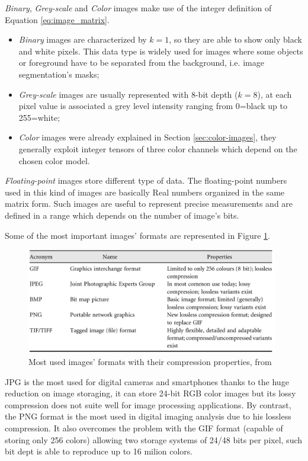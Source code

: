 \documentclass[../main.tex]{subfiles}
\begin{document}
\textit{Binary}, \textit{Grey-scale} and \textit{Color} images make use of the integer definition of Equation \ref{eq:image_matrix}.
\begin{itemize}
    \item \textit{Binary} images are  characterized by $k=1$, so they are able to show only black and white pixels. This data type is widely used for images where some objects or foreground have to be separated from the background, i.e. image segmentation's masks;
    \item \textit{Grey-scale} images are usually represented with 8-bit depth ($k=8$), at each pixel value is associated a grey level intensity ranging from 0=black up to 255=white;
    \item \textit{Color} images were already explained in Section \ref{sec:color-images}, they generally exploit integer tensors of three color channels which depend on the chosen color model.
\end{itemize}

\textit{Floating-point} images store different type of data. The floating-point numbers used in this kind of images are basically Real numbers organized in the same matrix form. Such images are useful to represent precise measurements and are defined in a range which depends on the number of image's bits.

Some of the most important images' formats are represented in Figure \ref{fig:table_formats}.

\begin{figure}[H] 
\begin{center}
\includegraphics[width=11cm]{images/image_formats.png}
\caption{\small{Most used images' formats with their compression properties, from \cite{digital_processing_matlab}}}\label{fig:table_formats}
\end{center}
\end{figure}

JPG is the most used for digital cameras and smartphones thanks to the huge reduction on image storaging, it can store 24-bit RGB color images but its lossy compression does not suite well for image processing applications. By contrast, the PNG format is the most used in digital imaging analysis due to his lossless compression. It  also overcomes the problem with the GIF format (capable of storing only 256 colors) allowing two storage systems of 24/48 bits per pixel\cite{roelofs1999png}, such bit dept is able to reproduce up to 16 milion colors.

 
\end{document}
